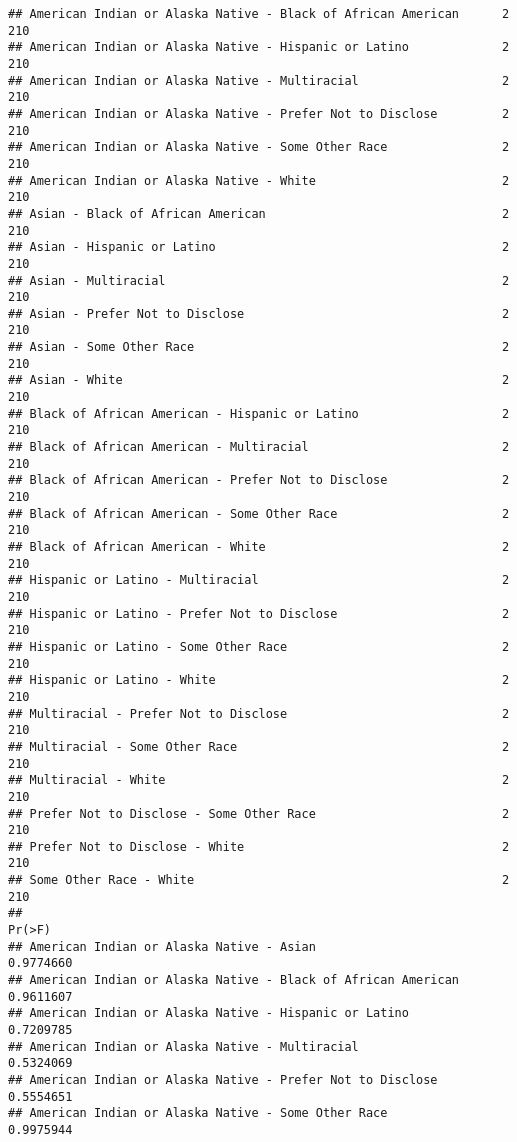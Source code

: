 \documentclass[
]{article}
\begin{document}
\begin{verbatim}
## American Indian or Alaska Native - Black of African American      2    210
## American Indian or Alaska Native - Hispanic or Latino             2    210
## American Indian or Alaska Native - Multiracial                    2    210
## American Indian or Alaska Native - Prefer Not to Disclose         2    210
## American Indian or Alaska Native - Some Other Race                2    210
## American Indian or Alaska Native - White                          2    210
## Asian - Black of African American                                 2    210
## Asian - Hispanic or Latino                                        2    210
## Asian - Multiracial                                               2    210
## Asian - Prefer Not to Disclose                                    2    210
## Asian - Some Other Race                                           2    210
## Asian - White                                                     2    210
## Black of African American - Hispanic or Latino                    2    210
## Black of African American - Multiracial                           2    210
## Black of African American - Prefer Not to Disclose                2    210
## Black of African American - Some Other Race                       2    210
## Black of African American - White                                 2    210
## Hispanic or Latino - Multiracial                                  2    210
## Hispanic or Latino - Prefer Not to Disclose                       2    210
## Hispanic or Latino - Some Other Race                              2    210
## Hispanic or Latino - White                                        2    210
## Multiracial - Prefer Not to Disclose                              2    210
## Multiracial - Some Other Race                                     2    210
## Multiracial - White                                               2    210
## Prefer Not to Disclose - Some Other Race                          2    210
## Prefer Not to Disclose - White                                    2    210
## Some Other Race - White                                           2    210
##                                                                 Pr(>F)    
## American Indian or Alaska Native - Asian                     0.9774660    
## American Indian or Alaska Native - Black of African American 0.9611607    
## American Indian or Alaska Native - Hispanic or Latino        0.7209785    
## American Indian or Alaska Native - Multiracial               0.5324069    
## American Indian or Alaska Native - Prefer Not to Disclose    0.5554651    
## American Indian or Alaska Native - Some Other Race           0.9975944    

\end{verbatim}
\end{document}
